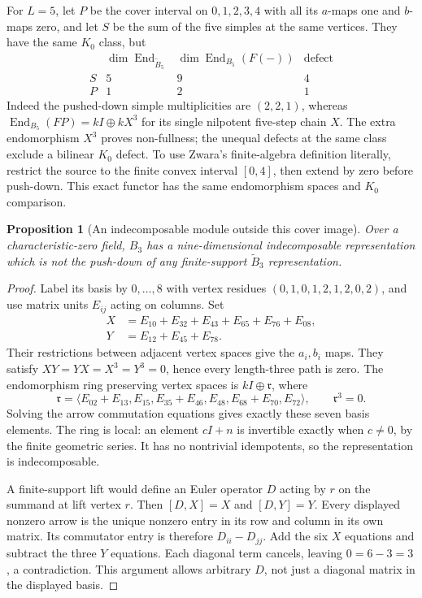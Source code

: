 \documentclass[11pt,oneside,openany]{book}
\newtheorem{proposition}[theorem]{Proposition}
\theoremstyle{definition}\newtheorem{definition}[theorem]{Definition}
\theoremstyle{remark}\newtheorem{remark}[theorem]{Remark}
\begin{document}
For $L=5$, let $P$ be the cover interval on $0,1,2,3,4$ with all its
$a$-maps one and $b$-maps zero, and let $S$ be the sum of the five simples
at the same vertices. They have the same $K_0$ class, but
\[
\begin{array}{c|ccc}
 &\dim\operatorname{End}_{\widetilde B_5}
 &\dim\operatorname{End}_{B_5}(F(-))&\text{defect}\\\hline
 S&5&9&4\\ P&1&2&1
\end{array}
\]
Indeed the pushed-down simple multiplicities are $(2,2,1)$, whereas
$\operatorname{End}_{B_5}(FP)=kI\oplus kX^3$ for its single nilpotent
five-step chain $X$. The extra endomorphism $X^3$ proves non-fullness;
the unequal defects at the same class exclude a bilinear $K_0$ defect.
To use Zwara's finite-algebra definition literally, restrict the source to
the finite convex interval $[0,4]$, then extend by zero before push-down.
This exact functor has the same endomorphism spaces and $K_0$ comparison.

\begin{proposition}[An indecomposable module outside this cover image]
\label{cover:band}
Over a characteristic-zero field, $B_3$ has a nine-dimensional
indecomposable representation which is not the push-down of any
finite-support $\widetilde B_3$ representation.
\end{proposition}
\begin{proof}
Label its basis by $0,\ldots,8$ with vertex residues
$(0,1,0,1,2,1,2,0,2)$, and use matrix units $E_{ij}$ acting on columns.
Set
\begin{align*}
 X&=E_{10}+E_{32}+E_{43}+E_{65}+E_{76}+E_{08},\\
 Y&=E_{12}+E_{45}+E_{78}.
\end{align*}
Their restrictions between adjacent vertex spaces give the $a_i,b_i$ maps.
They satisfy $XY=YX=X^3=Y^3=0$, hence every length-three path is zero.
The endomorphism ring preserving vertex spaces is $kI\oplus\mathfrak r$,
where
\[
 \mathfrak r=\langle E_{02}+E_{13},E_{15},E_{35}+E_{46},
                       E_{48},E_{68}+E_{70},E_{72}\rangle,
 \qquad \mathfrak r^3=0.
\]
Solving the arrow commutation equations gives exactly these seven basis
elements. The ring is local: an element $cI+n$ is invertible exactly when
$c\ne0$, by the finite geometric series. It has no nontrivial idempotents,
so the representation is indecomposable.

A finite-support lift would define an Euler operator $D$ acting by $r$ on
the summand at lift vertex $r$. Then $[D,X]=X$ and $[D,Y]=Y$.
Every displayed nonzero arrow is the unique nonzero entry in its row and
column in its own matrix. Its commutator entry is therefore
$D_{ii}-D_{jj}$. Add the six $X$ equations and subtract the three $Y$
equations. Each diagonal term cancels, leaving $0=6-3=3$, a contradiction.
This argument allows arbitrary $D$, not just a diagonal matrix in the
displayed basis.
\end{proof}
\end{document}
